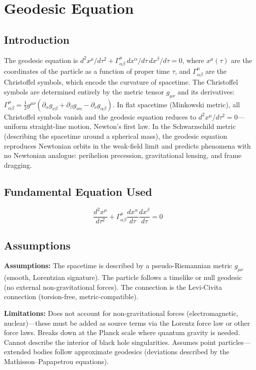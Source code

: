 \chapter{Geodesic Equation}

\section*{Introduction}

The geodesic equation is $d^2 x^\mu/d\tau^2 + \Gamma^\mu_{\alpha\beta}\,dx^\alpha/d\tau\,dx^\beta/d\tau = 0$, where $x^\mu(\tau)$ are the coordinates of the particle as a function of proper time $\tau$, and $\Gamma^\mu_{\alpha\beta}$ are the Christoffel symbols, which encode the curvature of spacetime. The Christoffel symbols are determined entirely by the metric tensor $g_{\mu\nu}$ and its derivatives: $\Gamma^\mu_{\alpha\beta} = \frac{1}{2}g^{\mu\nu}(\partial_\alpha g_{\nu\beta} + \partial_\beta g_{\nu\alpha} - \partial_\nu g_{\alpha\beta})$. In flat spacetime (Minkowski metric), all Christoffel symbols vanish and the geodesic equation reduces to $d^2 x^\mu/d\tau^2 = 0$---uniform straight-line motion, Newton's first law. In the Schwarzschild metric (describing the spacetime around a spherical mass), the geodesic equation reproduces Newtonian orbits in the weak-field limit and predicts phenomena with no Newtonian analogue: perihelion precession, gravitational lensing, and frame dragging.
\section*{Fundamental Equation Used}

\[
\frac{d^2 x^\mu}{d\tau^2}+\Gamma^\mu_{\alpha\beta}\frac{dx^\alpha}{d\tau}\frac{dx^\beta}{d\tau}=0
\]
\section*{Assumptions}

\textbf{Assumptions:} The spacetime is described by a pseudo-Riemannian metric $g_{\mu\nu}$ (smooth, Lorentzian signature). The particle follows a timelike or null geodesic (no external non-gravitational forces). The connection is the Levi-Civita connection (torsion-free, metric-compatible).


\textbf{Limitations:} Does not account for non-gravitational forces (electromagnetic, nuclear)---these must be added as source terms via the Lorentz force law or other force laws. Breaks down at the Planck scale where quantum gravity is needed. Cannot describe the interior of black hole singularities. Assumes point particles---extended bodies follow approximate geodesics (deviations described by the Mathisson--Papapetrou equations).



